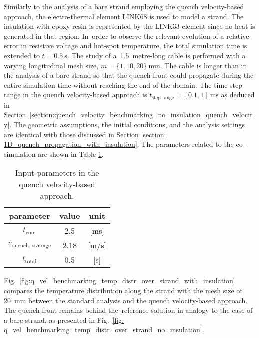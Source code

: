 
Similarly to the analysis of a bare strand employing the quench velocity-based approach, the electro-thermal element LINK68 is used to model a strand. The insulation with epoxy resin is represented by the LINK33 element since no heat is generated in that region. In~order to observe the relevant evolution of a relative error in resistive voltage and hot-spot temperature, the total simulation time is extended to $t=0.5~\text{s}$. The study of a~1.5~metre-long cable is performed with a varying longitudinal mesh size, $m=\{1, 10, 20\}~\text{mm}$. The cable is longer than in the analysis of a bare strand so that the quench front could propagate during the entire simulation time without reaching the end of the domain. The time step range in the quench velocity-based approach is $t_\text{step range}=[0.1, 1]~\text{ms}$ as deduced in Section~\ref{section:quench_velocity_benchmarking_no_insulation_quench_velocity}. The geometric assumptions, the initial conditions, and the analysis settings are identical with those discussed in Section \ref{section: 1D_quench_propagation_with_insulation}. The parameters related to the co-simulation are shown in Table \ref{table:1d_qv_benchmarking_geometry__with_insulation_parameters_quench_velocity}. 

\begin{table}[H]
    \caption{Input parameters in the quench velocity-based approach.} 
    \vspace{-1.em} 
    \fontsize{10}{10}
    \selectfont 
    \renewcommand{\arraystretch}{1.5}
    \begin{center}
        \begin{tabular}{ ccc }  
        \hline
        parameter & value & unit \\
        \hline
        $t_\text{com}$ & 2.5 & [ms] \\
        $v_\text{quench, average}$ & 2.18 & [m/s] \\
        $t_\text{total}$ & 0.5 & [s] \\
        \hline 
        \end{tabular}
    \end{center}  
    \label{table:1d_qv_benchmarking_geometry__with_insulation_parameters_quench_velocity} 
\end{table}

Fig.~\ref{fig:q_vel_benchmarking_temp_distr_over_strand_with_insulation} compares the temperature distribution along the strand with the mesh size of 20~mm between the standard analysis and the quench velocity-based approach. The quench front remains behind the~reference solution in analogy to the case of a bare strand, as presented in Fig.~\ref{fig: q_vel_benchmarking_temp_distr_over_strand_no_insulation}.

